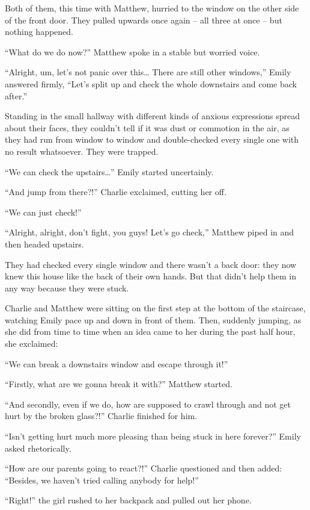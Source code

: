 Both of them, this time with Matthew, hurried to the window on the other side of the front door. They pulled upwards once again – all three at once – but nothing happened.

“What do we do now?” Matthew spoke in a stable but worried voice.

“Alright, um, let’s not panic over this… There are still other windows,” Emily answered firmly, “Let’s split up and check the whole downstairs and come back after.”

\bigskip

Standing in the small hallway with different kinds of anxious expressions spread about their faces, they couldn’t tell if it was dust or commotion in the air, as they had run from window to window and double-checked every single one with no result whatsoever. They were trapped.

“We can check the upstairs…” Emily started uncertainly.

“And jump from there?!” Charlie exclaimed, cutting her off.

“We can just check!”

“Alright, alright, don’t fight, you guys! Let’s go check,” Matthew piped in and then headed upstairs.

\bigskip

They had checked every single window and there wasn’t a back door: they now knew this house like the back of their own hands. But that didn’t help them in any way because they were stuck.

Charlie and Matthew were sitting on the first step at the bottom of the staircase, watching Emily pace up and down in front of them. Then, suddenly jumping, as she did from time to time when an idea came to her during the past half hour, she exclaimed:

“We can break a downstairs window and escape through it!”

“Firstly, what are we gonna break it with?” Matthew started.

“And secondly, even if we do, how are supposed to crawl through and not get hurt by the broken glass?!” Charlie finished for him.

“Isn’t getting hurt much more pleasing than being stuck in here forever?” Emily asked rhetorically.

“How are our parents going to react?!” Charlie questioned and then added: “Besides, we haven’t tried calling anybody for help!”

“Right!” the girl rushed to her backpack and pulled out her phone.

